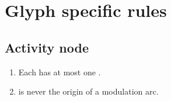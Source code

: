 \section{Glyph specific rules}







\subsection{Activity node}

 \begin{enumerate}
    \item Each  has at most one .
    \item {} is never the origin of a modulation arc.
 \end{enumerate}

